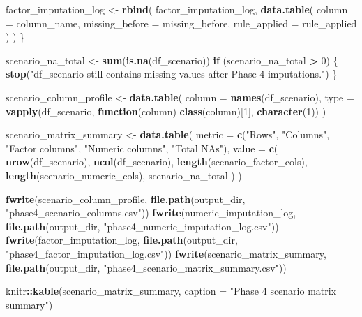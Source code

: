 \documentclass[
]{article}
\newenvironment{Shaded}{\begin{snugshade}}{\end{snugshade}}
\newcommand{\AttributeTok}[1]{\textcolor[rgb]{0.13,0.29,0.53}{#1}}
\newcommand{\ControlFlowTok}[1]{\textcolor[rgb]{0.13,0.29,0.53}{\textbf{#1}}}
\newcommand{\DecValTok}[1]{\textcolor[rgb]{0.00,0.00,0.81}{#1}}
\newcommand{\FunctionTok}[1]{\textcolor[rgb]{0.13,0.29,0.53}{\textbf{#1}}}
\newcommand{\NormalTok}[1]{#1}
\newcommand{\OtherTok}[1]{\textcolor[rgb]{0.56,0.35,0.01}{#1}}
\newcommand{\SpecialCharTok}[1]{\textcolor[rgb]{0.81,0.36,0.00}{\textbf{#1}}}
\newcommand{\StringTok}[1]{\textcolor[rgb]{0.31,0.60,0.02}{#1}}
\begin{document}
\begin{Shaded}
\begin{Highlighting}[]
\NormalTok{  factor\_imputation\_log }\OtherTok{\textless{}{-}} \FunctionTok{rbind}\NormalTok{(}
\NormalTok{    factor\_imputation\_log,}
    \FunctionTok{data.table}\NormalTok{(}
      \AttributeTok{column =}\NormalTok{ column\_name,}
      \AttributeTok{missing\_before =}\NormalTok{ missing\_before,}
      \AttributeTok{rule\_applied =}\NormalTok{ rule\_applied}
\NormalTok{    )}
\NormalTok{  )}
\NormalTok{\}}

\NormalTok{scenario\_na\_total }\OtherTok{\textless{}{-}} \FunctionTok{sum}\NormalTok{(}\FunctionTok{is.na}\NormalTok{(df\_scenario))}
\ControlFlowTok{if}\NormalTok{ (scenario\_na\_total }\SpecialCharTok{\textgreater{}} \DecValTok{0}\NormalTok{) \{}
  \FunctionTok{stop}\NormalTok{(}\StringTok{"df\_scenario still contains missing values after Phase 4 imputations."}\NormalTok{)}
\NormalTok{\}}

\NormalTok{scenario\_column\_profile }\OtherTok{\textless{}{-}} \FunctionTok{data.table}\NormalTok{(}
  \AttributeTok{column =} \FunctionTok{names}\NormalTok{(df\_scenario),}
  \AttributeTok{type =} \FunctionTok{vapply}\NormalTok{(df\_scenario, }\ControlFlowTok{function}\NormalTok{(column) }\FunctionTok{class}\NormalTok{(column)[}\DecValTok{1}\NormalTok{], }\FunctionTok{character}\NormalTok{(}\DecValTok{1}\NormalTok{))}
\NormalTok{)}

\NormalTok{scenario\_matrix\_summary }\OtherTok{\textless{}{-}} \FunctionTok{data.table}\NormalTok{(}
  \AttributeTok{metric =} \FunctionTok{c}\NormalTok{(}\StringTok{"Rows"}\NormalTok{, }\StringTok{"Columns"}\NormalTok{, }\StringTok{"Factor columns"}\NormalTok{, }\StringTok{"Numeric columns"}\NormalTok{, }\StringTok{"Total NAs"}\NormalTok{),}
  \AttributeTok{value =} \FunctionTok{c}\NormalTok{(}
    \FunctionTok{nrow}\NormalTok{(df\_scenario),}
    \FunctionTok{ncol}\NormalTok{(df\_scenario),}
    \FunctionTok{length}\NormalTok{(scenario\_factor\_cols),}
    \FunctionTok{length}\NormalTok{(scenario\_numeric\_cols),}
\NormalTok{    scenario\_na\_total}
\NormalTok{  )}
\NormalTok{)}

\FunctionTok{fwrite}\NormalTok{(scenario\_column\_profile, }\FunctionTok{file.path}\NormalTok{(output\_dir, }\StringTok{"phase4\_scenario\_columns.csv"}\NormalTok{))}
\FunctionTok{fwrite}\NormalTok{(numeric\_imputation\_log, }\FunctionTok{file.path}\NormalTok{(output\_dir, }\StringTok{"phase4\_numeric\_imputation\_log.csv"}\NormalTok{))}
\FunctionTok{fwrite}\NormalTok{(factor\_imputation\_log, }\FunctionTok{file.path}\NormalTok{(output\_dir, }\StringTok{"phase4\_factor\_imputation\_log.csv"}\NormalTok{))}
\FunctionTok{fwrite}\NormalTok{(scenario\_matrix\_summary, }\FunctionTok{file.path}\NormalTok{(output\_dir, }\StringTok{"phase4\_scenario\_matrix\_summary.csv"}\NormalTok{))}

\NormalTok{knitr}\SpecialCharTok{::}\FunctionTok{kable}\NormalTok{(scenario\_matrix\_summary, }\AttributeTok{caption =} \StringTok{"Phase 4 scenario matrix summary"}\NormalTok{)}
\end{Highlighting}
\end{Shaded}
\end{document}
